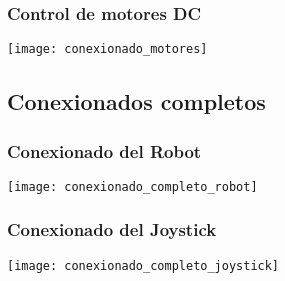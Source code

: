 \subsubsection{Control de motores DC}


\begin{center}
  \texttt{[image: conexionado\_motores]}
    \label{fig:conexionado_motores}

\end{center}



\subsection{Conexionados completos}


\subsubsection{Conexionado del Robot}


\begin{center}
  \texttt{[image: conexionado\_completo\_robot]}
    \label{fig:conexionado_completo_robot}
\end{center}


\subsubsection{Conexionado del Joystick}

\begin{center}
  \texttt{[image: conexionado\_completo\_joystick]}
    \label{fig:conexionado_completo_joystick}
\end{center}




